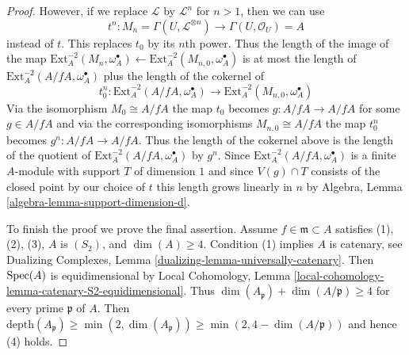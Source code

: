\begin{proof}
\medskip\noindent
However, if we replace $\mathcal{L}$ by $\mathcal{L}^n$ for $n > 1$,
then we can use
$$
t^n :
M_n = \Gamma(U, \mathcal{L}^{\otimes n})
\longrightarrow
\Gamma(U, \mathcal{O}_U) = A
$$
instead of $t$. This replaces $t_0$ by its $n$th power.
Thus the length of the image of the map
$\text{Ext}^{-2}_A(M_n, \omega_A^\bullet) \leftarrow
\text{Ext}^{-2}_A(M_{n, 0}, \omega_A^\bullet)$
is at most the length of $\text{Ext}^{-2}_A(A/fA, \omega_A^\bullet)$
plus the length of the cokernel of
$$
t_0^n : 
\text{Ext}^{-2}_A(A/fA, \omega_A^\bullet)
\longrightarrow
\text{Ext}^{-2}_A(M_{n, 0}, \omega_A^\bullet)
$$
Via the isomorphism $M_0 \cong A/fA$ the map $t_0$ becomes
$g : A/fA \to A/fA$ for some $g \in A/fA$ and via the corresponding
isomorphisms $M_{n, 0} \cong A/fA$ the map $t_0^n$ becomes
$g^n : A/fA \to A/fA$. Thus the length of the cokernel above
is the length of the quotient of
$\text{Ext}^{-2}_A(A/fA, \omega_A^\bullet)$ by $g^n$.
Since $\text{Ext}^{-2}_A(A/fA, \omega_A^\bullet)$ is a finite $A$-module
with support $T$ of dimension $1$ and since $V(g) \cap T$
consists of the closed point by our choice of $t$
this length grows linearly in $n$ by
Algebra, Lemma \ref{algebra-lemma-support-dimension-d}.

\medskip\noindent
To finish the proof we prove the final assertion. Assume
$f \in \mathfrak m \subset A$ satisfies
(1), (2), (3), $A$ is $(S_2)$, and $\dim(A) \geq 4$.
Condition (1) implies $A$ is catenary, see
Dualizing Complexes, Lemma \ref{dualizing-lemma-universally-catenary}.
Then $\mathop{\mathrm{Spec}}(A)$ is equidimensional by Local Cohomology, Lemma
\ref{local-cohomology-lemma-catenary-S2-equidimensional}.
Thus $\dim(A_\mathfrak p) + \dim(A/\mathfrak p) \geq 4$
for every prime $\mathfrak p$ of $A$. Then
$\text{depth}(A_\mathfrak p) \geq \min(2, \dim(A_\mathfrak p))
\geq \min(2, 4 - \dim(A/\mathfrak p))$ and hence (4) holds.
\end{proof}

